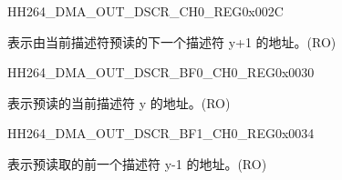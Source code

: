 \begin{register}{H}{H264\_DMA\_OUT\_DSCR\_CH0\_REG}{0x002C}\label{regdesc:H264DMAOUTDSCRCH0REG}
%
\regnewline%
\begin{regdesc}\begin{reglist}
\label{fielddesc:H264DMAOUTLINKDSCRCH0}\item [H264\_DMA\_OUTLINK\_DSCR\_CH0] 表示由当前描述符预读的下一个描述符 y+1 的地址。(RO)
\end{reglist}\end{regdesc}
\end{register}


\begin{register}{H}{H264\_DMA\_OUT\_DSCR\_BF0\_CH0\_REG}{0x0030}\label{regdesc:H264DMAOUTDSCRBF0CH0REG}
%
\regnewline%
\begin{regdesc}\begin{reglist}
\label{fielddesc:H264DMAOUTLINKDSCRBF0CH0}\item [H264\_DMA\_OUTLINK\_DSCR\_BF0\_CH0] 表示预读的当前描述符 y 的地址。(RO)
\end{reglist}\end{regdesc}
\end{register}


\begin{register}{H}{H264\_DMA\_OUT\_DSCR\_BF1\_CH0\_REG}{0x0034}\label{regdesc:H264DMAOUTDSCRBF1CH0REG}
%
\regnewline%
\begin{regdesc}\begin{reglist}
\label{fielddesc:H264DMAOUTLINKDSCRBF1CH0}\item [H264\_DMA\_OUTLINK\_DSCR\_BF1\_CH0] 表示预读取的前一个描述符 y-1 的地址。(RO)
\end{reglist}\end{regdesc}
\end{register}


